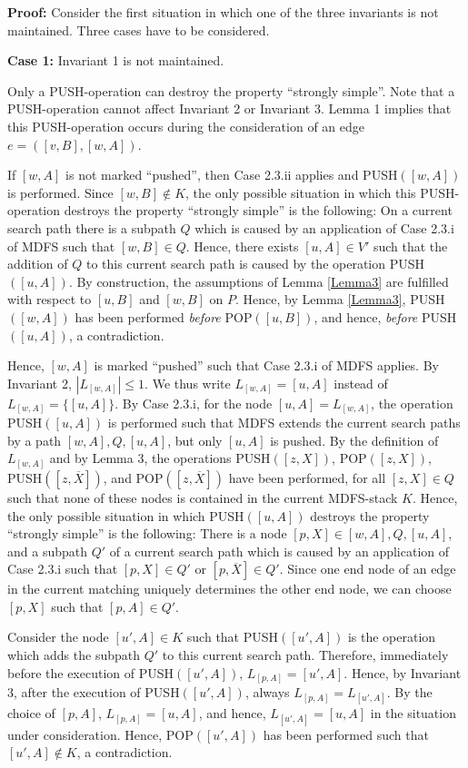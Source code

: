 \documentclass[12pt,twoside,a4paper]{article}
\begin{document}
\medskip
\noindent
{\bf Proof:} Consider the first situation in which one of the three invariants
is not maintained. Three cases have to be considered.

\medskip
\noindent
{\bf Case 1:} Invariant 1 is not maintained.

\medskip
Only a PUSH-operation can destroy the property ``strongly simple''. Note that
a PUSH-operation cannot affect Invariant 2 or Invariant 3.
Lemma 1 implies that this PUSH-operation occurs during the consideration
of an edge $e = ([v,B],[w,A])$. 

If $[w,A]$ is not marked ``pushed'', then Case 2.3.ii applies and
PUSH$([w,A])$ is performed. Since $[w,B] \not\in K$, 
the only possible situation in which this PUSH-operation destroys the
property ``strongly simple'' is the following:
On a current search path there is a subpath $Q$ which is caused by an 
application of Case 2.3.i of MDFS such that $[w,B] \in Q$.
Hence, there exists $[u,A] \in V'$ such that the addition of $Q$ to this 
current search path is caused by the operation PUSH$([u,A])$. By construction, 
the assumptions of Lemma \ref{Lemma3} are fulfilled with respect to $[u,B]$ and $[w,B]$ on $P$. 
Hence, by Lemma \ref{Lemma3}, PUSH$([w,A])$ has been performed {\em before\/} 
POP$([u,B])$, and hence, {\em before\/} PUSH$([u,A])$, a contradiction. 

Hence, $[w,A]$ is marked ``pushed'' such that Case 2.3.i of MDFS 
applies. By Invariant 2, $|L_{[w,A]}| \leq 1$. We thus write 
$L_{[w,A]} = [u,A]$ instead of $L_{[w,A]} = \{[u,A]\}$. 
By Case 2.3.i, for the node $[u,A] = L_{[w,A]}$, the operation PUSH$([u,A])$
is performed such that MDFS extends the current search paths by a path $[w,A],Q,[u,A]$, 
but only $[u,A]$ is pushed. 
By the definition of $L_{[w,A]}$ and by Lemma 3, the operations PUSH$([z,X])$,
POP$([z,X])$, PUSH$([z,\overline{X}])$, and POP$([z,\overline{X}])$ have been 
performed, for all $[z,X] \in Q$ such that none of these nodes is contained
in the current MDFS-stack $K$. Hence, the only possible situation in which
PUSH$([u,A])$ destroys the property ``strongly simple'' is the following:
There is a node $[p,X] \in [w,A],Q,[u,A]$, and a subpath $Q'$ of a current
search path which is caused by an application of Case 2.3.i such that
$[p,X] \in Q'$ or $[p,\overline{X}] \in Q'$. Since one end node of an edge in 
the current matching uniquely determines the other end node, we can choose 
$[p,X]$ such that $[p,A] \in Q'$.

Consider the node $[u',A] \in K$ such that PUSH$([u',A])$ is the operation which adds 
the subpath $Q'$ to this current search path. Therefore, immediately before the execution
of PUSH$([u',A])$, $L_{[p,A]} = [u',A]$. Hence, by Invariant 3,
after the execution of PUSH$([u',A])$, always $L_{[p,A]} = L_{[u',A]}$. By
the choice of $[p,A]$, $L_{[p,A]} = [u,A]$, and hence, $L_{[u',A]} = [u,A]$ in 
the situation under consideration. Hence, 
POP$([u',A])$ has been performed such that $[u',A] \not\in K$, a contradiction. 
\end{document}
